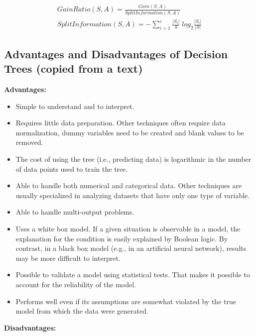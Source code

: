 \documentclass[12pt]{report}
\begin{document}
\begin{gather*}
	GainRatio(S,A)  = \frac{Gain(S,A)}{SplitInformation(S,A)} \\
	SplitInformation(S,A) = - \sum_{i=1}^c \frac{|S_i|}{S} \; log_2\frac{|S_i|}{|S|}
\end{gather*}


\subsection{Advantages and Disadvantages of Decision Trees (copied from a text)}
\textbf{Advantages:}

\begin{itemize}
\item Simple to understand and to interpret.
\item Requires little data preparation. Other techniques often require data normalization, dummy variables need to be created and blank values to be removed.
\item The cost of using the tree (i.e., predicting data) is logarithmic in the number of data points used to train the tree.
\item Able to handle both numerical and categorical data. Other techniques are usually specialized in analyzing datasets that have only one type of variable.
\item Able to handle multi-output problems.
\item Uses a white box model. If a given situation is observable in a model, the explanation for the condition is easily explained by Boolean logic. By contrast, in a black box model (e.g., in an artificial neural network), results may be more difficult to interpret.
\item Possible to validate a model using statistical tests. That makes it possible to account for the reliability of the model.
\item Performs well even if its assumptions are somewhat violated by the true model from which the data were generated.
\end{itemize}

\textbf{Disadvantages:}
\end{document}
